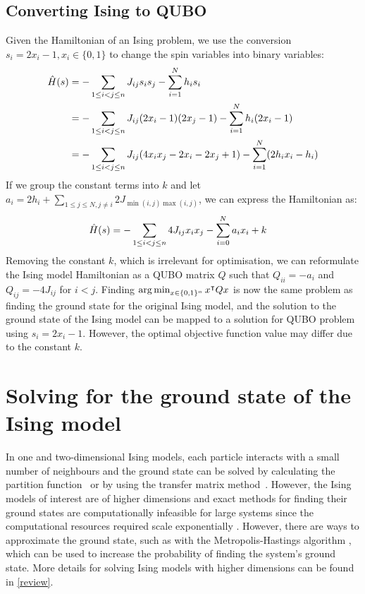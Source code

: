 \subsection{Converting Ising to QUBO}\label{isingtoqubo}
Given the Hamiltonian of an Ising problem, we use the conversion $s_i = 2x_i - 1, x_i \in \{0, 1\}$ to change the spin variables into binary variables:
\begin{align}
    \Hat{H}(s) &= -\sum_{1\leq i < j \leq n} J_{ij}s_i s_j - \sum_{i=1}^N h_i s_i \nonumber\\
    &= -\sum_{1\leq i < j \leq n} J_{ij}(2x_i - 1) (2x_j - 1) - \sum_{i=1}^N h_i (2x_i - 1) \nonumber\\
    &= -\sum_{1\leq i < j \leq n} J_{ij}(4x_i x_j - 2x_i - 2x_j + 1) - \sum_{i=1}^N (2h_i x_i - h_i) \nonumber
\end{align}
If we group the constant terms into $k$ and let $a_i = 2h_i + \sum_{1\leq j \leq N, j \neq i} 2J_{\min(i,j)\max(i,j)}$, we can express the Hamiltonian as:
\begin{align}
    \Hat{H}(s) &= -\sum_{1\leq i < j \leq n} 4J_{ij}x_i x_j - \sum_{i=0}^N a_{i}x_i + k \nonumber
\end{align}
Removing the constant $k$, which is irrelevant for optimisation, we can reformulate the Ising model Hamiltonian as a QUBO matrix $Q$ such that $Q_{ii} = -a_i$ and $Q_{ij} = -4J_{ij}$ for $i < j$. Finding $\operatorname*{arg\,min}_{x \in \{0, 1\}^n} x^\intercal Q x$ is now the same problem as finding the ground state for the original Ising model, and the solution to the ground state of the Ising model can be mapped to a solution for QUBO problem using $s_i = 2x_i - 1$. However, the optimal objective function value may differ due to the constant $k$.

\section{Solving for the ground state of the Ising model}
In one and two-dimensional Ising models, each particle interacts with a small number of neighbours and the ground state can be solved by calculating the partition function~\cite{onsager} or by using the transfer matrix method~\cite{kramerising}. However, the Ising models of interest are of higher dimensions and exact methods for finding their ground states are computationally infeasible for large systems since the computational resources required scale exponentially \cite{barahona1982computational}. However, there are ways to approximate the ground state, such as with the Metropolis-Hastings algorithm \cite{metropolissampling}, which can be used to increase the probability of finding the system's ground state. More details for solving Ising models with higher dimensions can be found in \autoref{review}.

